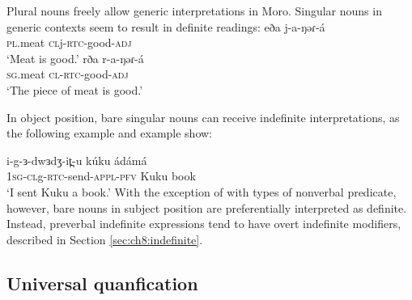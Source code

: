 Plural nouns freely allow generic interpretations in Moro. Singular nouns in generic contexts seem to result in definite readings:
\ea 
	\ea \gll  	eða		j-a-ŋəɾ-á\\
		\textsc{pl}.meat 	\textsc{cl}j-\textsc{rtc}-good-\textsc{adj}\\
		\glt 	‘Meat is good.’
	\ex \gll rða		r-a-ŋəɾ-á \\
		\textsc{sg}.meat 	\textsc{cl}-\textsc{rtc}-good-\textsc{adj}\\
		\glt ‘The piece of meat is good.’  \hfill %
	\z
\z 

\ea 	
\z 
\z %

In object position, bare singular nouns can receive indefinite interpretations, as the following example and example  show:

\ea \gll i-g-ɜ-dwɜdʒ-it̪-u kúku ádámá\\
		1\textsc{sg}-\textsc{cl}g-\textsc{rtc}-send-\textsc{appl}-\textsc{pfv} Kuku book\\	
	\glt 	‘I sent Kuku a book.’	 \hfill %
\z
With the exception of with types of nonverbal predicate, however, bare nouns in subject position are preferentially interpreted as definite. Instead, preverbal indefinite expressions tend to have overt indefinite modifiers, described in Section \ref{sec:ch8:indefinite}. 

\subsection{Universal quanfication}\label{sec:ch8:universal}


